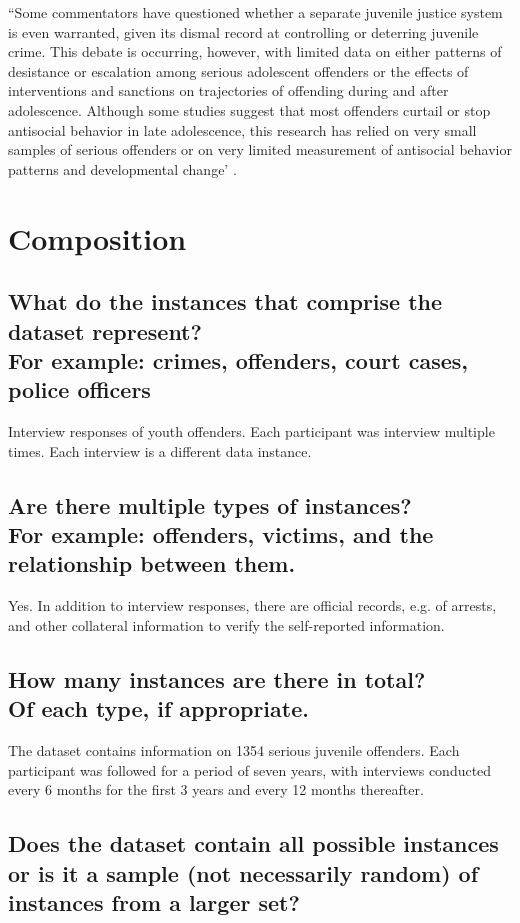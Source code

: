 \documentclass[letterpaper, 10 pt, conference]{ieeeconf}  %
\newcommand{\subtitle}[1]{{\\ \small \normalfont \color{purple} #1}}
\begin{document}
``Some commentators have questioned whether a separate juvenile justice system is even warranted, given its dismal record at controlling or deterring juvenile crime. This debate is occurring, however, with limited data on either patterns of desistance or escalation among serious adolescent offenders or the effects of interventions and sanctions on trajectories of offending during and after adolescence. Although some studies suggest that most offenders curtail or stop antisocial behavior in late adolescence, this research has relied on very small samples of serious offenders or on very limited measurement of antisocial behavior patterns and developmental change' \cite{pathways_website}.

\section{Composition}

\subsection{What do the instances that comprise the dataset represent? \subtitle{For example: crimes, offenders, court cases, police officers}}

Interview responses of youth offenders. Each participant was interview multiple times. Each interview is a different data instance. 

\subsection{Are there multiple types of instances? \subtitle{For example: offenders, victims, and the relationship between them.}}

Yes. In addition to interview responses, there are official records, e.g. of arrests, and other collateral information to verify the self-reported information. 

\subsection{How many instances are there in total? \subtitle{Of each type, if appropriate.}}

The dataset contains information on 1354 serious juvenile offenders. Each participant was followed for a period of seven years, with interviews conducted every 6 months for the first 3 years and every 12 months thereafter.

\subsection{Does the dataset contain all possible instances or is it a sample (not necessarily random) of instances from a larger set?}
\end{document}
